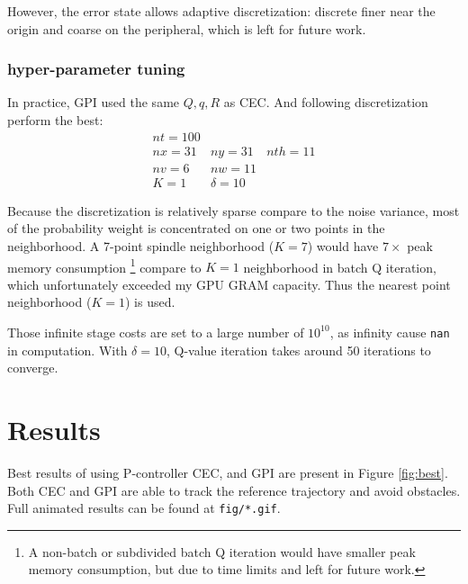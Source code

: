 \documentclass[conference]{IEEEtran}
\begin{document}
However, the error state allows adaptive discretization: 
discrete finer near the origin and coarse on the peripheral, 
which is left for future work.

\subsubsection{hyper-parameter tuning}
In practice, GPI used the same $Q,q,R$ as CEC. 
And following discretization perform the best:
\[
\begin{array}{lll}
nt=100&&\\ 
nx=31&ny=31&nth=11\\ 
nv=6&nw=11&\\
K=1&\delta = 10\end{array} 
\]

Because the discretization is relatively sparse compare to the noise variance,
most of the probability weight is concentrated on one or two points in the neighborhood.
A 7-point spindle neighborhood ($K=7$) would have $7\times$ peak memory consumption
\footnote{A non-batch or subdivided batch Q iteration would have smaller peak memory consumption, 
but due to time limits and left for future work.}
compare to $K=1$ neighborhood in batch Q iteration,
which unfortunately exceeded my GPU GRAM capacity.
Thus the nearest point neighborhood ($K=1$) is used.

Those infinite stage costs are set to a large number of $10^{10}$, 
as infinity cause \texttt{nan} in computation.
With $\delta=10$, Q-value iteration takes around 50 iterations to converge.

\section{Results}
Best results of using P-controller CEC, and GPI are present in Figure \ref{fig:best}.
Both CEC and GPI are able to track the reference trajectory and avoid obstacles.
Full animated results can be found at \texttt{fig/*.gif}.
\end{document}
